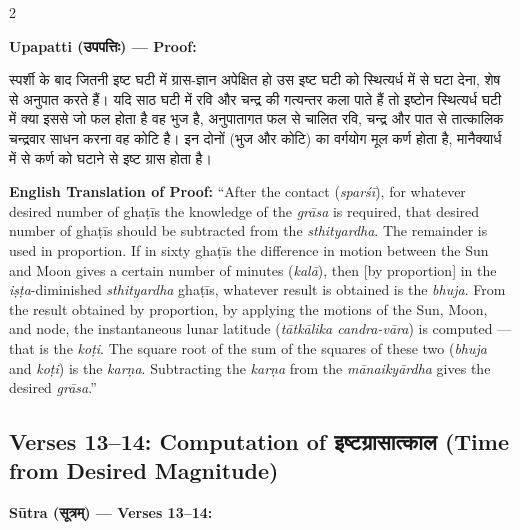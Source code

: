 \documentclass[11pt,a4paper]{article}
\newcommand{\dev}[1]{{\devanagarifont #1}}
\newenvironment{sanskritverse}{%
  \begin{center}\begin{minipage}{0.95\textwidth}
  \setlength{\leftskip}{1em}
  \setlength{\rightskip}{1em}
  \dev
}{\end{minipage}\end{center}}
\begin{document}
\vspace{0.5em}

\begin{paracol}{2}

\noindent\textbf{Upapatti (\dev{उपपत्तिः}) — Proof:}
\begin{sanskritverse}
स्पर्शी के बाद जितनी इष्ट घटी में ग्रास-ज्ञान अपेक्षित हो उस इष्ट घटी को स्थित्यर्ध में से घटा
देना, शेष से अनुपात करते हैं। यदि साठ घटी में रवि और चन्द्र की गत्यन्तर कला पाते हैं तो
इष्टोन स्थित्यर्ध घटी में क्या इससे जो फल होता है वह भुज है, अनुपातागत फल से चालित रवि,
चन्द्र और पात से तात्कालिक चन्द्रवार साधन करना वह कोटि है। इन दोनों (भुज और कोटि)
का वर्गयोग मूल कर्ण होता है, मानैक्यार्ध में से कर्ण को घटाने से इष्ट ग्रास होता है।
\end{sanskritverse}

\switchcolumn

\textbf{English Translation of Proof:} ``After the contact (\textit{sparśī}), for whatever desired number of ghaṭīs the knowledge of the \textit{grāsa} is required, that desired number of ghaṭīs should be subtracted from the \textit{sthityardha}. The remainder is used in proportion. If in sixty ghaṭīs the difference in motion between the Sun and Moon gives a certain number of minutes (\textit{kalā}), then [by proportion] in the \textit{iṣṭa}-diminished \textit{sthityardha} ghaṭīs, whatever result is obtained is the \textit{bhuja}. From the result obtained by proportion, by applying the motions of the Sun, Moon, and node, the instantaneous lunar latitude (\textit{tātkālika candra-vāra}) is computed --- that is the \textit{koṭi}. The square root of the sum of the squares of these two (\textit{bhuja} and \textit{koṭi}) is the \textit{karṇa}. Subtracting the \textit{karṇa} from the \textit{mānaikyārdha} gives the desired \textit{grāsa}.''

\end{paracol}

\subsection{Verses 13--14: Computation of \texorpdfstring{{\devanagarifont इष्टग्रासात्काल}}{iṣṭagrāsāt-kāla} (Time from Desired Magnitude)}

\vspace{0.5em}
\noindent\textbf{Sūtra (\dev{सूत्रम्}) — Verses 13--14:}
\end{document}
